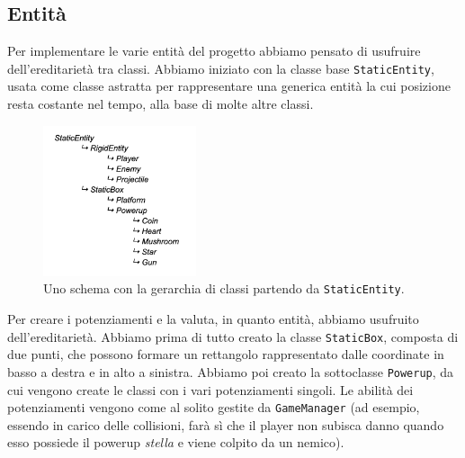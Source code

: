 \documentclass[a4paper,12pt]{article}
\begin{document}
\subsection{Entità}
Per implementare le varie entità del progetto abbiamo pensato di usufruire dell’ereditarietà tra classi. Abbiamo iniziato con la classe base \texttt{StaticEntity}, usata come classe astratta per rappresentare una generica entità la cui posizione resta costante nel tempo, alla base di molte altre classi.
\begin{figure}
\centering
\includegraphics[width=0.4\textwidth]{hierarchy.png}
\captionsetup{labelformat=empty}
\caption{\small Uno schema con la gerarchia di classi partendo da \texttt{StaticEntity}.}
\end{figure}


Per creare i potenziamenti e la valuta, in quanto entità, abbiamo usufruito dell’ereditarietà. Abbiamo prima di tutto creato la classe \texttt{StaticBox}, composta di due punti, che possono formare un rettangolo rappresentato dalle coordinate in basso a destra e in alto a sinistra.
Abbiamo poi creato la sottoclasse \texttt{Powerup}, da cui vengono create le classi con i vari potenziamenti singoli. Le abilità dei potenziamenti vengono come al solito gestite da \texttt{GameManager} (ad esempio, essendo in carico delle collisioni, farà sì che il player non subisca danno quando esso possiede il powerup \textit{stella} e viene colpito da un nemico).\\
\end{document}
